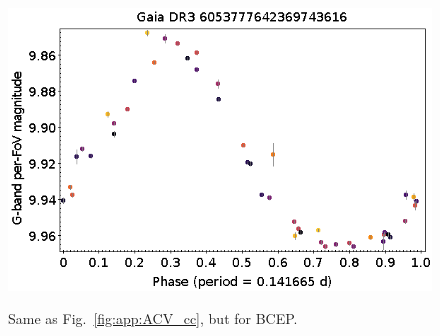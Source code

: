 \documentclass[longauth]{aa}
\begin{document}
\begin{appendix}
\begin{figure}
\hspace{2mm}
 \includegraphics[width=0.45\hsize]{figures/appendix/BCEP-87.png} \\
\vspace{4mm}
 \caption{Same as Fig.~\ref{fig:app:ACV_cc}, but for BCEP.}
 \label{fig:app:BCEP_cc}
\end{figure}




\end{appendix}
\end{document}
